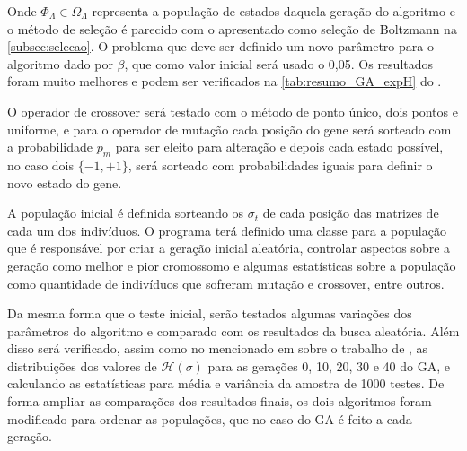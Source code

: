 Onde \(\Phi_{\Lambda} \in \Omega_{\Lambda} \) representa a população de estados daquela geração do algoritmo e o método de seleção é parecido com o apresentado como seleção de Boltzmann na \autoref{subsec:selecao}. O problema que deve ser definido um novo parâmetro para o algoritmo dado por \(\beta \), que como valor inicial será usado o 0,05. Os resultados foram muito melhores e podem ser verificados na \autoref{tab:resumo_GA_expH} do .

O operador de crossover será testado com o método de ponto único, dois pontos e uniforme, e para o operador de mutação cada posição do gene será sorteado com a probabilidade \(p_m\) para ser eleito para alteração e depois cada estado possível, no caso dois \(\{ -1, +1\}\), será sorteado com probabilidades iguais para definir o novo estado do gene.

A população inicial é definida sorteando os \(\sigma_t\) de cada posição das matrizes de cada um dos indivíduos. O programa terá definido uma classe para a população que é responsável por criar a geração inicial aleatória, controlar aspectos sobre a geração como melhor e pior cromossomo e algumas estatísticas sobre a população como quantidade de indivíduos que sofreram mutação e crossover, entre outros. 

Da mesma forma que o teste inicial, serão testados algumas variações dos parâmetros do algoritmo e comparado com os resultados da busca aleatória. Além disso será verificado, assim como no mencionado em  sobre o trabalho de , as distribuições dos valores de \(\mathcal{H}(\sigma)\) para as gerações 0, 10, 20, 30 e 40 do GA, e calculando as estatísticas para média e variância da amostra de 1000 testes. De forma ampliar as comparações dos resultados finais, os dois algoritmos foram modificado para ordenar as populações, que no caso do GA é feito a cada geração.

